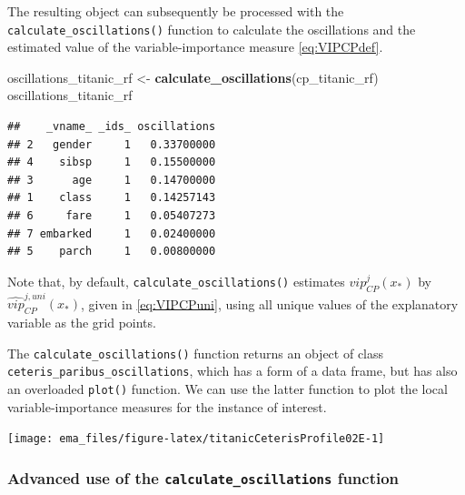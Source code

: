 \documentclass[12pt,]{krantz}
\newenvironment{Shaded}{\begin{snugshade}}{\end{snugshade}}
\newcommand{\DataTypeTok}[1]{\textcolor[rgb]{0.13,0.29,0.53}{#1}}
\newcommand{\KeywordTok}[1]{\textcolor[rgb]{0.13,0.29,0.53}{\textbf{#1}}}
\newcommand{\NormalTok}[1]{#1}
\newcommand{\OperatorTok}[1]{\textcolor[rgb]{0.81,0.36,0.00}{\textbf{#1}}}
\newcommand{\StringTok}[1]{\textcolor[rgb]{0.31,0.60,0.02}{#1}}
\begin{document}
The resulting object can subsequently be processed with the \texttt{calculate\_oscillations()} function to calculate the oscillations and the estimated value of the variable-importance measure \eqref{eq:VIPCPdef}.

\begin{Shaded}
\begin{Highlighting}[]
\NormalTok{oscillations_titanic_rf <-}\StringTok{ }\KeywordTok{calculate_oscillations}\NormalTok{(cp_titanic_rf)}
\NormalTok{oscillations_titanic_rf}
\end{Highlighting}
\end{Shaded}

\begin{verbatim}
##    _vname_ _ids_ oscillations
## 2   gender     1   0.33700000
## 4    sibsp     1   0.15500000
## 3      age     1   0.14700000
## 1    class     1   0.14257143
## 6     fare     1   0.05407273
## 7 embarked     1   0.02400000
## 5    parch     1   0.00800000
\end{verbatim}

Note that, by default, \texttt{calculate\_oscillations()} estimates \(vip_{CP}^j(x_*)\) by \(\widehat{vip}_{CP}^{j,uni}(x_*)\), given in \eqref{eq:VIPCPuni}, using all unique values of the explanatory variable as the grid points.

The \texttt{calculate\_oscillations()} function returns an object of class \texttt{ceteris\_paribus\_oscillations}, which has a form of a data frame, but has also an overloaded \texttt{plot()} function. We can use the latter function to plot the local variable-importance measures for the instance of interest.

\begin{Shaded}
\end{Shaded}

\begin{center}\texttt{[image: ema\_files/figure-latex/titanicCeterisProfile02E-1]} \end{center}

\hypertarget{advanced-use-of-the-calculate_oscillations-function}{%
\subsubsection{\texorpdfstring{Advanced use of the \texttt{calculate\_oscillations} function}{Advanced use of the calculate\_oscillations function}}\label{advanced-use-of-the-calculate_oscillations-function}}
\end{document}
